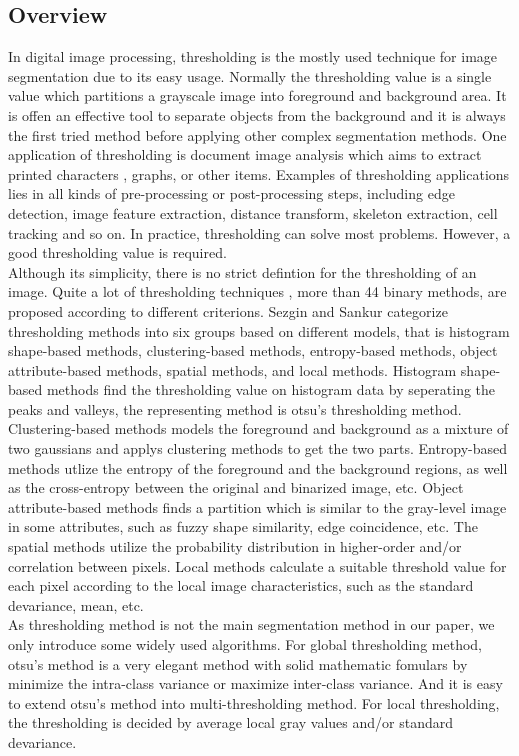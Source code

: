 \documentclass[b5,12pt]{report}
\begin{document}
\subsection{Overview}
In digital image processing, thresholding is the mostly used technique for image segmentation due to its easy usage. Normally the thresholding value is a single value which partitions a grayscale image into foreground and background area. It is offen an effective tool to separate objects from the background and it is always the first tried method before applying other complex segmentation methods. One application of thresholding is document image analysis which aims to extract printed characters \cite{kamel1993extraction,abak1997performance}, graphs, or other items. Examples of thresholding applications lies in all kinds of pre-processing or post-processing steps, including edge detection, image feature extraction, distance transform, skeleton extraction, cell tracking and so on. In practice, thresholding can solve most problems. However, a good thresholding value is required.\\ 
Although its simplicity, there is no strict defintion for the thresholding of an image. Quite a lot of thresholding techniques \cite{sahoo1988survey, sankur2001image, sezgin2004survey}, more than 44 binary methods, are proposed according to different criterions. Sezgin and Sankur \cite{sankur2001image, sezgin2004survey} categorize thresholding methods into six groups based on different models, that is histogram shape-based methods, clustering-based methods, entropy-based methods, object attribute-based methods, spatial methods, and local methods. Histogram shape-based methods find the thresholding value on histogram data by seperating the peaks and valleys, the representing method is otsu's thresholding method. Clustering-based methods models the foreground and background as a mixture of two gaussians and applys clustering methods to get the two parts. Entropy-based methods utlize the entropy of the foreground and the background regions, as well as the cross-entropy between the original and binarized image, etc. Object attribute-based methods finds a partition which is similar to the gray-level image in some attributes, such as fuzzy shape similarity, edge coincidence, etc. The spatial methods utilize the probability distribution in higher-order and/or correlation between pixels. Local methods calculate a suitable threshold value for each pixel according to the local image characteristics, such as the standard devariance, mean, etc.\\
As thresholding method is not the main segmentation method in our paper, we only introduce some widely used algorithms. For global thresholding method, otsu's method \cite{otsu1975threshold} is a very elegant method with solid mathematic fomulars by minimize the intra-class variance or maximize inter-class variance. And it is easy to extend otsu's method into multi-thresholding method. For local thresholding, the thresholding is decided by average local gray values and/or standard devariance. 
\end{document}
